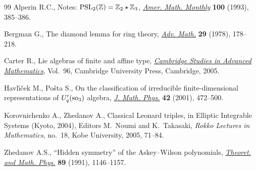 \documentclass[11pt]{article}
\numberwithin{equation}{section}
\begin{document}
\begin{thebibliography}{99}
Alperin R.C.,
Notes: ${\rm  {PSL}}_2(\mathbb Z)= \mathbb Z_2 \star \mathbb Z_3$,
\href{http://dx.doi.org/10.2307/2324963}{{\it Amer. Math. Monthly}} {\bf 100} (1993), 385--386.

Bergman G.,
The diamond  lemma for ring theory,
\href{http://dx.doi.org/10.1016/0001-8708(78)90010-5}{{\it Adv. Math.}} {\bf 29} (1978), 178--218.


Carter R.,
Lie algebras of f\/inite and af\/f\/ine type,
\href{http://dx.doi.org/10.1017/CBO9780511614910}{{\it Cambridge Studies in Advanced Mathematics}}, Vol.~96,
Cambridge University Press, Cambridge, 2005.



Havl{\'{\i}}{\v{c}}ek M.,  Po\v{s}ta S.,
On the classif\/ication of irreducible f\/inite-dimensional representations of $U'_q({\rm so}_3)$ algebra,
\href{http://dx.doi.org/10.1063/1.1328078}{{\it J. Math. Phys.}} {\bf 42} (2001), 472--500.




Korovnichenko A., Zhedanov A.,
Classical Leonard triples,
in Elliptic Integrable Systems (Kyoto, 2004), Editors M.~Noumi and K.~Takasaki,
{\it Rokko Lectures in Mathematics}, no.~18, Kobe University, 2005, 71--84.


Zhedanov A.S.,
``Hidden symmetry'' of the Askey--Wilson polynomials,
\href{http://dx.doi.org/10.1007/BF01015906}{{\it Theoret. and Math. Phys.}} {\bf 89} (1991), 1146--1157.


\end{thebibliography}
\end{document}
